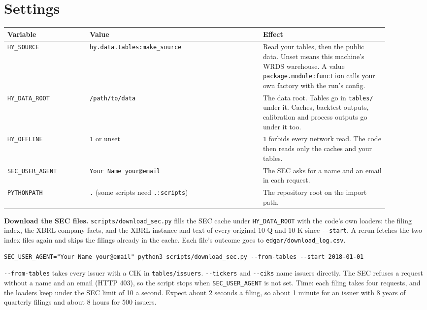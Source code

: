 \documentclass[10.5pt,a4paper]{article}
\newcommand{\code}[1]{\texttt{\small #1}}
\begin{document}
\section{Settings}

\begin{longtable}{@{}>{\raggedright\arraybackslash}p{0.198\linewidth}>{\raggedright\arraybackslash}p{0.405\linewidth}>{\raggedright\arraybackslash}p{0.297\linewidth}@{}}
\toprule
\textbf{Variable} & \textbf{Value} & \textbf{Effect}\\
\midrule
\endhead
\code{HY\_\allowbreak{}SOURCE} & \code{hy.data.tables:make\_\allowbreak{}source} & Read your tables, then the public data. Unset means this machine's WRDS warehouse. A value \code{package.module:function} calls your own factory with the run's config.\\
\code{HY\_\allowbreak{}DATA\_\allowbreak{}ROOT} & \code{/\allowbreak{}path/\allowbreak{}to/\allowbreak{}data} & The data root. Tables go in \code{tables/\allowbreak{}} under it. Caches, backtest outputs, calibration and process outputs go under it too.\\
\code{HY\_\allowbreak{}OFFLINE} & \code{1} or unset & \code{1} forbids every network read. The code then reads only the caches and your tables.\\
\code{SEC\_\allowbreak{}USER\_\allowbreak{}AGENT} & \code{Your Name your@email} & The SEC asks for a name and an email in each request.\\
\code{PYTHONPATH} & \code{.} (some scripts need \code{.:scripts}) & The repository root on the import path.\\
\bottomrule
\end{longtable}

\textbf{Download the SEC files.} \code{scripts/\allowbreak{}download\_\allowbreak{}sec.py} fills the SEC cache under \code{HY\_\allowbreak{}DATA\_\allowbreak{}ROOT} with the code's own loaders: the filing index, the XBRL company facts, and the XBRL instance and text of every original 10-Q and 10-K since \code{-{}-start}. A rerun fetches the two index files again and skips the filings already in the cache. Each file's outcome goes to \code{edgar/\allowbreak{}download\_\allowbreak{}log.csv}.

\begin{lstlisting}
SEC_USER_AGENT="Your Name your@email" python3 scripts/download_sec.py --from-tables --start 2018-01-01
\end{lstlisting}

\code{-{}-from-tables} takes every issuer with a CIK in \code{tables/\allowbreak{}issuers}. \code{-{}-tickers} and \code{-{}-ciks} name issuers directly. The SEC refuses a request without a name and an email (HTTP 403), so the script stops when \code{SEC\_\allowbreak{}USER\_\allowbreak{}AGENT} is not set. Time: each filing takes four requests, and the loaders keep under the SEC limit of 10 a second. Expect about 2 seconds a filing, so about 1 minute for an issuer with 8 years of quarterly filings and about 8 hours for 500 issuers.
\end{document}
